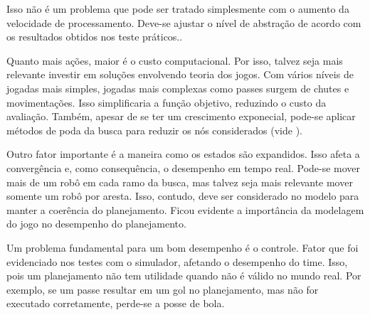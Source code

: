 Isso não é um problema que pode ser tratado simplesmente com o aumento da
velocidade de processamento. Deve-se ajustar o nível de abstração de acordo com
os resultados obtidos nos teste práticos..

Quanto mais ações, maior é o custo computacional. Por isso, talvez seja mais
relevante investir em soluções envolvendo teoria dos jogos. Com vários níveis de
jogadas mais simples, jogadas mais complexas como passes surgem de chutes e
movimentações. Isso simplificaria a função objetivo, reduzindo o custo da
avaliação. Também, apesar de se ter um crescimento exponecial, pode-se aplicar
métodos de poda da busca para reduzir os nós considerados (vide
\cite{russell2003artificial}).

Outro fator importante é a maneira como os estados são expandidos. Isso afeta a
convergência e, como consequência, o desempenho em tempo real. Pode-se mover
mais de um robô em cada ramo da busca, mas talvez seja mais relevante mover
somente um robô por aresta. Isso, contudo, deve ser considerado no modelo para
manter a coerência do planejamento.  Ficou evidente a importância da modelagem
do jogo no desempenho do planejamento.

Um problema fundamental para um bom desempenho é o controle.  Fator que foi
evidenciado nos testes com o simulador, afetando o desempenho do time. Isso,
pois um planejamento não tem utilidade quando não é válido no mundo real. Por
exemplo, se um passe resultar em um gol no planejamento, mas não for executado
corretamente, perde-se a posse de bola.


